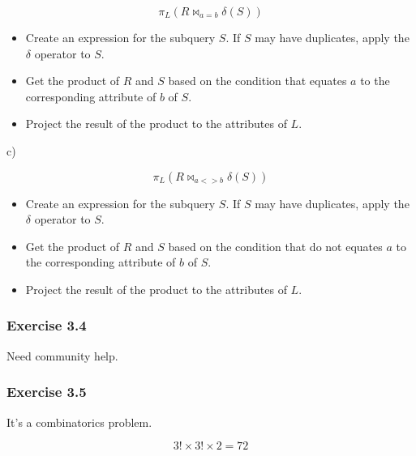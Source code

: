\documentclass[../../main.tex]{subfiles}
\begin{document}
$$
\pi_{L}(R \bowtie_{a = b} \delta(S))
$$

\begin{itemize}
  \item Create an expression for the subquery $S$. If $S$ may have duplicates,
        apply the $\delta$ operator to $S$.
  \item Get the product of $R$ and $S$ based on the condition that equates
        $a$ to the corresponding attribute of $b$ of $S$.
  \item Project the result of the product to the attributes of $L$.
\end{itemize}

c)

$$
\pi_{L}(R \bowtie_{a <> b} \delta(S))
$$

\begin{itemize}
  \item Create an expression for the subquery $S$. If $S$ may have duplicates,
        apply the $\delta$ operator to $S$.
  \item Get the product of $R$ and $S$ based on the condition that do not equates
        $a$ to the corresponding attribute of $b$ of $S$.
  \item Project the result of the product to the attributes of $L$.
\end{itemize}

\subsubsection*{Exercise 3.4}

Need community help.

\subsubsection*{Exercise 3.5}

It's a combinatorics problem.

$$
3! \times 3! \times 2 = 72
$$
\end{document}
